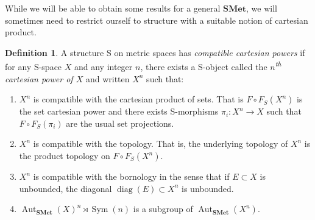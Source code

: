 \documentclass[a4paper]{article}
\theoremstyle{definition}
\newtheorem{defn}[lem]{Definition}
\DeclareMathOperator\Sym{Sym}
\DeclareMathOperator\diag{diag}
\DeclareMathOperator\Aut{Aut}
\DeclareMathOperator\id{id}
\newcommand*{\orbite}{\mathcal O}
\begin{document}
While we will be able to obtain some results for a general $\mathbf{SMet}$, we will sometimes need to restrict ourself to structure with a suitable notion of cartesian product.
%
%
\begin{defn}\label{Def:Cartesian}
A structure S on metric spaces has \emph{compatible cartesian powers} if for any S-space $X$ and any integer $n$, there exists a S-object called the \emph{$n$\textsuperscript{th} cartesian power of $X$} and written $X^n$ such that:
\begin{enumerate}
\item
$X^n$ is compatible with the cartesian product of sets. That is $F\circ F_S(X^n)$ is the set cartesian power and there exists S-morphisms $\pi_i\colon X^n\to X$ such that $F\circ F_S(\pi_i)$ are the usual set projections.
\item\label{Condidef:1}
$X^n$ is compatible with the topology. That is, the underlying topology of  $X^n$ is the product topology on $F\circ F_S(X^n)$.
\item\label{Condidef:2}
$X^n$ is compatible with the bornology in the sense that if $E\subset X$ is unbounded, the diagonal $\diag(E)\subset X^n$ is unbounded.
\item\label{Item:Product}
$\Aut_{\mathbf{SMet}}(X)^n\rtimes \Sym(n)$ is a subgroup of $\Aut_{\mathbf{SMet}}(X^n)$.
\end{enumerate}
%
\end{defn}
\end{document}
